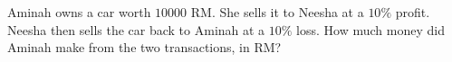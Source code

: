 Aminah owns a car worth $10000$ RM. She sells it to Neesha at a $10\%$ profit. Neesha then sells the car back to Aminah at a $10\%$ loss. How much money did Aminah make from the two transactions, in RM?
